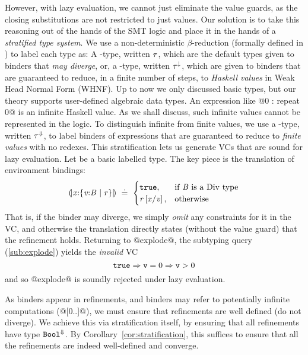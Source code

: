 However, with lazy evaluation, we cannot just 
eliminate the value guards, as the closing 
substitutions are not restricted to just values.
%
Our solution is to take this reasoning out of the 
hands of the SMT logic and place it in the hands of 
a \emph{stratified type system}.
%
We use a non-deterministic $\beta$-reduction 
(formally defined in )
to label each type as:
%
A \Div-type, written ${\mathit{\tau}}$,
which are the default types given to binders 
that \emph{may diverge}, or,
%
a \Wnf-type, written ${\mathit{\tau}}^{\downarrow}$, 
which are given to binders that are guaranteed to 
reduce, in a finite number of steps, to \emph{Haskell values}
in Weak Head Normal Form (WHNF).
%
Up to now we only discussed \tint basic types, but 
our theory supports user-defined algebraic data types.
%
An expression like @0 : repeat 0@ is an infinite Haskell value.
%
As we shall discuss, such infinite values cannot be represented in the logic.
%
To distinguish infinite from finite values, we use a \Fin-type, written ${\mathit{\tau}}^{\Downarrow}$,
to label binders of expressions that are guaranteed to reduce to \emph{finite values} with no redexes.
This stratification lets us generate VCs that are sound 
for lazy evaluation. 
%
Let \Base be a basic labelled type. 
%
The key piece is the translation of environment bindings:
$$
\embed{\ttbind{\x}{\tttref{\vv}{\Base}{}{\refi}}} \defeq 
  \begin{cases}
    \tttrue,         & \mbox{if $\Base$ is a \Div type} \\ 
    \SUBST{\lref}{\vv}{\x}, & \mbox{otherwise}
  \end{cases}
$$
That is, if the binder may diverge, we simply \emph{omit} 
any constraints for it in the VC, and otherwise the translation 
directly states (\ie without the value guard) that the 
refinement holds.
%
Returning to @explode@, the subtyping query (\ref{sub:explode}) 
yields the \emph{invalid} VC
$$
\mathtt{true} \Rightarrow \mathtt{v} = 0 \Rightarrow \mathtt{v} > 0
$$
and so @explode@ is soundly rejected under lazy evaluation.

As binders appear in refinements, and binders may refer 
to potentially infinite computations (\eg @[0..]@), we must 
ensure that refinements are well defined (\ie do not diverge).
%
We achieve this via stratification itself, \ie by ensuring that 
all refinements have type ${\mathtt{Bool}}^{\Downarrow}$. By
Corollary~\ref{cor:stratification}, this suffices to ensure that 
all the refinements are indeed well-defined and converge.



